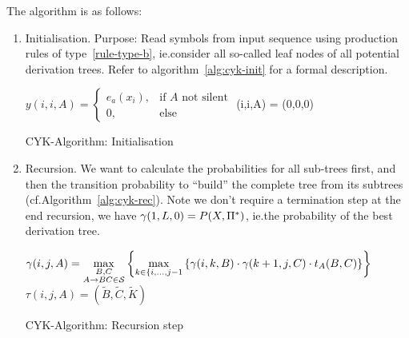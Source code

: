 The algorithm is as follows:
\begin{enumerate}[label=(\alph*)]
\item Initialisation.  Purpose: Read symbols from input sequence using
  production rules of type~\ref{rule-type-b}, ie.\@ consider all so-called leaf
  nodes of all potential derivation trees.  Refer to
  algorithm~\ref{alg:cyk-init} for a formal description.

\AlgoDisplayBlockMarkers\SetAlgoNoLine%
\begin{algorithm}[ht]
 {
     {
        $y(i,i,A) = \begin{cases} e_a(x_i), &\text{if \(A\) not silent}\\ 0, &\text{else} \end{cases}$ \;
        \tau(i,i,A) = (0,0,0) 
    }
}
\label{alg:cyk-init}
\caption{CYK-Algorithm: Initialisation}
\end{algorithm}

\item Recursion.  We want to calculate the probabilities for all sub-trees
  first, and then the transition probability to \enquote{build} the complete
  tree from its subtrees (cf.\@ Algorithm~\ref{alg:cyk-rec}).  Note we don't
  require a termination step at the end recursion, we have
  \(\gamma(1,L,0)=P(X,\Pi^*)\), ie.\@ the probability of the best derivation
  tree.

\AlgoDisplayBlockMarkers\SetAlgoNoLine%
\begin{algorithm}[ht]
 {
     {
         {
            $\gamma(i,j,A) = \max\limits_{\substack{B,C\\A\to BC\in\mathcal{S}}}
                \left\{ \max\limits_{k\in\{i,\dotsc,j-1}
                \left\{ \gamma(i,k,B) \cdot \gamma(k+1,j,C) \cdot t_A(B,C) \right\} \right\} $\;
            $\tau(i,j,A) = (\widetilde{B},\widetilde{C},\widetilde{K})$
        }
    }
}
\label{alg:cyk-rec}
\caption{CYK-Algorithm: Recursion step}
\end{algorithm}

\end{enumerate}

